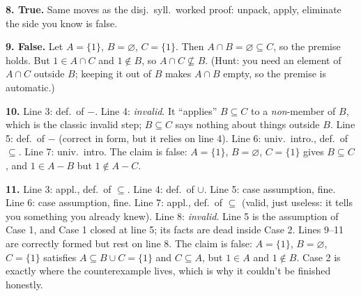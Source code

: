\textbf{8. True.} Same moves as the disj.\ syll.\ worked proof: unpack, apply, eliminate the side you know is false.

\begin{center}
\end{center}

\textbf{9. False.} Let $A=\{1\}$, $B=\varnothing$, $C=\{1\}$. Then $A\cap B=\varnothing\subseteq C$, so the premise holds. But $1\in A\cap C$ and $1\notin B$, so $A\cap C\not\subseteq B$. (Hunt: you need an element of $A\cap C$ outside $B$; keeping it out of $B$ makes $A\cap B$ empty, so the premise is automatic.)

\textbf{10.} Line 3: def.\ of $-$. Line 4: \emph{invalid}. It ``applies'' $B\subseteq C$ to a \emph{non}-member of $B$, which is the classic invalid step; $B\subseteq C$ says nothing about things outside $B$. Line 5: def.\ of $-$ (correct in form, but it relies on line 4). Line 6: univ.\ intro., def.\ of $\subseteq$. Line 7: univ.\ intro. The claim is false: $A=\{1\}$, $B=\varnothing$, $C=\{1\}$ gives $B\subseteq C$, and $1\in A-B$ but $1\notin A-C$.

\textbf{11.} Line 3: appl., def.\ of $\subseteq$. Line 4: def.\ of $\cup$. Line 5: case assumption, fine. Line 6: case assumption, fine. Line 7: appl., def.\ of $\subseteq$ (valid, just useless: it tells you something you already knew). Line 8: \emph{invalid}. Line 5 is the assumption of Case 1, and Case 1 closed at line 5; its facts are dead inside Case 2. Lines 9--11 are correctly formed but rest on line 8. The claim is false: $A=\{1\}$, $B=\varnothing$, $C=\{1\}$ satisfies $A\subseteq B\cup C=\{1\}$ and $C\subseteq A$, but $1\in A$ and $1\notin B$. Case 2 is exactly where the counterexample lives, which is why it couldn't be finished honestly.


